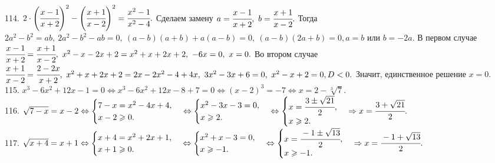 \documentclass[12pt]{article}
\begin{document}
114. $2\cdot\left(\cfrac{x-1}{x+2}\right)^2-\left(\cfrac{x+1}{x-2}\right)^2=\cfrac{x^2-1}{x^2-4}.$ Сделаем замену $a=\cfrac{x-1}{x+2},\ b=\cfrac{x+1}{x-2}.$ Тогда $2a^2-b^2=ab,\ 2a^2-b^2-ab=0,\ (a-b)(a+b)+a(a-b)=0,\ (a-b)(2a+b)=0, a=b$ или $b=-2a.$ В первом случае $\cfrac{x-1}{x+2}=\cfrac{x+1}{x-2},\ x^2-x-2x+2=x^2+x+2x+2,\ -6x=0,\ x=0.$ Во втором случае $\cfrac{x+1}{x-2}=\cfrac{2-2x}{x+2},\ x^2+x+2x+2=2x-2x^2-4+4x,\ 3x^2-3x+6=0,\ x^2-x+2=0, D<0.$ Значит, единственное решение $x=0.$\\
115. $x^3-6x^2+12x-1=0\Leftrightarrow x^3-6x^2+12x-8+7=0 \Leftrightarrow (x-2)^3=-7 \Leftrightarrow x=2-\sqrt[3]{7}.$\\
116. $\sqrt{7-x}=x-2\Leftrightarrow\begin{cases} 7-x=x^2-4x+4,\\ x-2\geqslant0.\end{cases}\Leftrightarrow\begin{cases} x^2-3x-3=0,\\ x\geqslant2.\end{cases}\Leftrightarrow\begin{cases} x=\cfrac{3\pm\sqrt{21}}{2},\\ x\geqslant2.\end{cases}\Rightarrow x=\cfrac{3+\sqrt{21}}{2}.$\\
117. $\sqrt{x+4}=x+1\Leftrightarrow\begin{cases} x+4=x^2+2x+1,\\ x+1\geqslant0.\end{cases}\Leftrightarrow\begin{cases} x^2+x-3=0,\\ x\geqslant-1.\end{cases}\Leftrightarrow\begin{cases} x=\cfrac{-1\pm\sqrt{13}}{2},\\ x\geqslant-1.\end{cases}\Rightarrow x=\cfrac{-1+\sqrt{13}}{2}.$\\
\end{document}
